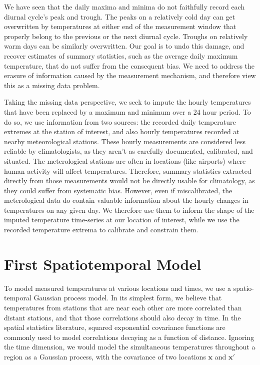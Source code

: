 \documentclass[letter]{article}
\newcommand{\xvec}{\mathbold{x}}
\begin{document}
We have seen that the daily maxima and minima do not faithfully record
each diurnal cycle's peak and trough. The peaks on a relatively cold day
can get overwritten by temperatures at either end of the measurement
window that properly belong to the previous or the next diurnal cycle.
Troughs on relatively warm days can be similarly overwritten. Our goal
is to undo this damage, and recover estimates of summary statistics,
such as the average daily maximum temperature, that do not suffer from
the consequent bias. We need to address the erasure of information
caused by the measurement mechanism, and therefore view this as a
missing data problem.

Taking the missing data perspective, we seek to impute the hourly
temperatures that have been replaced by a maximum and minimum over a 24
hour period. To do so, we use information from two sources: the recorded
daily temperature extremes at the station of interest, and also hourly
temperatures recorded at nearby meteorological stations. These hourly
measurements are considered less reliable by climatologists, as they
aren't as carefully documented, calibrated, and situated. The
meterological stations are often in locations (like airports) where
human activity will affect temperatures. Therefore, summary statistics
extracted directly from those measurements would not be directly usable
for climatology, as they could suffer from systematic bias. However,
even if miscalibrated, the meterological data do contain valuable
information about the hourly changes in temperatures on any given day.
We therefore use them to inform the shape of the imputed temperature
time-series at our location of interest, while we use the recorded
temperature extrema to calibrate and constrain them.
    


    	\section{First Spatiotemporal Model}\label{first-spatiotemporal-model}

To model measured temperatures at various locations and times, we use a
spatio-temporal Gaussian process model. In its simplest form, we believe
that temperatures from stations that are near each other are more
correlated than distant stations, and that those correlations should
also decay in time. In the spatial statistics literature, squared
exponential covariance functions are commonly used to model correlations
decaying as a function of distance. Ignoring the time dimension, we
would model the simultaneous temperatures throughout a region as a
Gaussian process, with the covariance of two locations \(\xvec\) and
\(\xvec'\)
\end{document}
